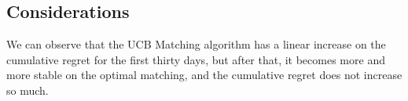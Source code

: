 \subsection*{Considerations}
We can observe that the UCB Matching algorithm has a linear increase on the cumulative regret for the first thirty days, but after that, it becomes more and more stable on the optimal matching, and the cumulative regret does not increase so much.